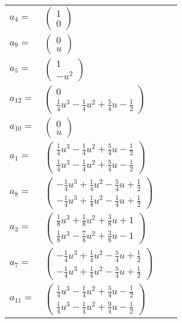 \documentclass[1p]{elsarticle_modified}
\theoremstyle{definition}
\begin{document}
\begin{tabular}{m{7pt} m{180pt} m{7pt} m{180pt} }
\flushright $a_{4}=$&$\begin{pmatrix}1\\0\end{pmatrix}$ \\
\flushright $a_{9}=$&$\begin{pmatrix}0\\u\end{pmatrix}$ \\
\flushright $a_{5}=$&$\begin{pmatrix}1\\- u^2\end{pmatrix}$ \\
\flushright $a_{12}=$&$\begin{pmatrix}0\\\frac{1}{4} u^3-\frac{1}{4} u^2+\frac{5}{4} u-\frac{1}{2}\end{pmatrix}$ \\
\flushright $a_{10}=$&$\begin{pmatrix}0\\u\end{pmatrix}$ \\
\flushright $a_{1}=$&$\begin{pmatrix}\frac{1}{4} u^3-\frac{1}{4} u^2+\frac{5}{4} u-\frac{1}{2}\\\frac{1}{4} u^3-\frac{1}{4} u^2+\frac{5}{4} u-\frac{1}{2}\end{pmatrix}$ \\
\flushright $a_{8}=$&$\begin{pmatrix}-\frac{1}{4} u^3+\frac{1}{4} u^2-\frac{5}{4} u+\frac{1}{2}\\-\frac{1}{4} u^3+\frac{1}{4} u^2-\frac{1}{4} u+\frac{1}{2}\end{pmatrix}$ \\
\flushright $a_{3}=$&$\begin{pmatrix}\frac{1}{8} u^3+\frac{1}{8} u^2+\frac{3}{8} u+1\\\frac{1}{8} u^3-\frac{7}{8} u^2+\frac{3}{8} u-1\end{pmatrix}$ \\
\flushright $a_{7}=$&$\begin{pmatrix}-\frac{1}{4} u^3+\frac{1}{4} u^2-\frac{5}{4} u+\frac{1}{2}\\-\frac{1}{4} u^3+\frac{1}{4} u^2-\frac{5}{4} u+\frac{1}{2}\end{pmatrix}$ \\
\flushright $a_{11}=$&$\begin{pmatrix}\frac{1}{4} u^3-\frac{1}{4} u^2+\frac{5}{4} u-\frac{1}{2}\\\frac{1}{4} u^3-\frac{1}{4} u^2+\frac{9}{4} u-\frac{1}{2}\end{pmatrix}$ \\

\end{tabular}
\end{document}
